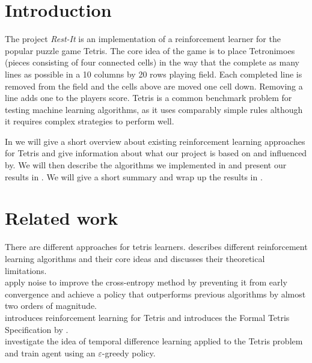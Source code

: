 \documentclass{ml}
\begin{document}


\section{Introduction}
\label{intro}
The project \textit{Rest-It} is an implementation of a reinforcement learner for the popular puzzle game Tetris. 
The core idea of the game is to place Tetronimoes (pieces consisting of four connected cells) in the way that the complete as many lines as possible in a 10 columns by 20 rows playing field.
Each completed line is removed from the field and the cells above are moved one cell down.
Removing a line adds one to the players score.
Tetris is a common benchmark problem for testing machine learning algorithms, as it uses comparably simple rules although it requires complex strategies to perform well. 

In  we will give a short overview about existing reinforcement learning approaches for Tetris and give information about what our project is based on and influenced by.
We will then describe the algorithms we implemented in  and present our results in .
We will give a short summary and wrap up the results in .


\section{Related work}
\label{relatedwork}
There are different approaches for tetris learners. 
\cite{szepesvari2010algorithms} describes different reinforcement learning algorithms and their core ideas and discusses their theoretical  limitations. \\
\cite{szita2006learning} apply noise to improve the cross-entropy method by preventing it from early convergence and achieve a policy that outperforms previous algorithms by almost two orders of magnitude.\\
\cite{carr2005applying} introduces reinforcement learning for Tetris and introduces the Formal Tetris Specification by \cite{faheytetris}.\\
\cite{gross2008learningto} investigate the idea of temporal difference learning applied to the Tetris problem and train agent using an $\varepsilon$-greedy policy. 
\end{document}
